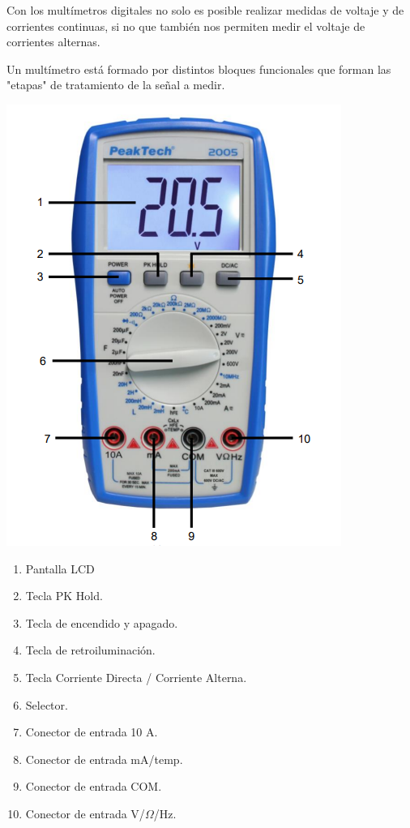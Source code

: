 \documentclass[10pt]{article}
\begin{document}
\begin{multicols}{2}
Con los multímetros digitales no solo es posible realizar medidas de voltaje y de corrientes continuas, si no que también nos permiten medir el voltaje de corrientes alternas.

Un multímetro está formado por distintos bloques funcionales que forman las "etapas" de tratamiento de la señal a medir.

\begin{center}
	\includegraphics[scale = 0.5]{Imagenes/Marco/Multimetro.PNG}\\
	\begin{enumerate}
		\item Pantalla LCD
		\item Tecla PK Hold.
		\item Tecla de encendido y apagado.
		\item Tecla de retroiluminación.
		\item Tecla Corriente Directa / Corriente Alterna.
		\item Selector.
		\item Conector de entrada 10 A.
		\item Conector de entrada mA/temp.
		\item Conector de entrada COM.
		\item Conector de entrada V/$\Omega$/Hz.
	\end{enumerate}
\end{center}


\end{multicols}
\end{document}
